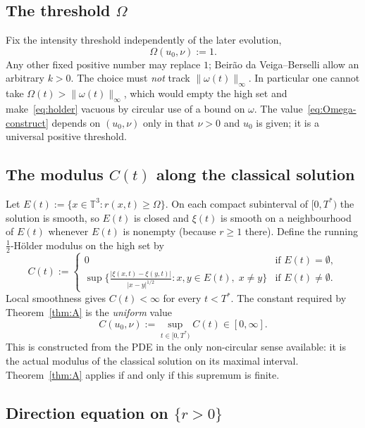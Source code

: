 \documentclass[11pt,a4paper]{article}
\theoremstyle{definition}
\theoremstyle{remark}
\newcommand{\T}{\mathbb{T}}
\newcommand{\abs}[1]{\lvert#1\rvert}
\newcommand{\norm}[1]{\lVert#1\rVert}
\begin{document}
\subsection{The threshold \(\Omega\)}

Fix the intensity threshold independently of the later evolution,
\begin{equation}
\label{eq:Omega-construct}
\Omega(u_0,\nu):=1.
\end{equation}
Any other fixed positive number may replace \(1\); Beir\~ao da Veiga--Berselli
allow an arbitrary \(k>0\). The choice must \emph{not} track
\(\norm{\omega(t)}_\infty\). In particular one cannot take
\(\Omega(t)>\norm{\omega(t)}_\infty\), which would empty the high set
and make~\eqref{eq:holder} vacuous by circular use of a bound on
\(\omega\). The value~\eqref{eq:Omega-construct} depends on \((u_0,\nu)\)
only in that \(\nu>0\) and \(u_0\) is given; it is a universal positive
threshold.

\subsection{The modulus \(C(t)\) along the classical solution}

Let \(E(t):=\{x\in\T^3:r(x,t)\ge\Omega\}\). On each compact subinterval
of \([0,T^*)\) the solution is smooth, so \(E(t)\) is closed and \(\xi(t)\)
is smooth on a neighbourhood of \(E(t)\) whenever \(E(t)\) is nonempty
(because \(r\ge 1\) there). Define the running \(\tfrac12\)-H\"older
modulus on the high set by
\begin{equation}
\label{eq:C-running}
C(t):=
\begin{cases}
0 & \text{if }E(t)=\emptyset,\\
\sup\bigl\{\frac{\abs{\xi(x,t)-\xi(y,t)}}{\abs{x-y}^{1/2}}:
x,y\in E(t),\; x\neq y\bigr\}
& \text{if }E(t)\neq\emptyset.
\end{cases}
\end{equation}
Local smoothness gives \(C(t)<\infty\) for every \(t<T^*\). The constant
required by Theorem~\ref{thm:A} is the \emph{uniform} value
\begin{equation}
\label{eq:C-construct}
C(u_0,\nu):=\sup_{t\in[0,T^*)}C(t)\in[0,\infty].
\end{equation}
This is constructed from the PDE in the only non-circular sense available:
it is the actual modulus of the classical solution on its maximal interval.
Theorem~\ref{thm:A} applies if and only if this supremum is finite.

\subsection{Direction equation on \(\{r>0\}\)}
\label{sec:xi-pde}
\end{document}
